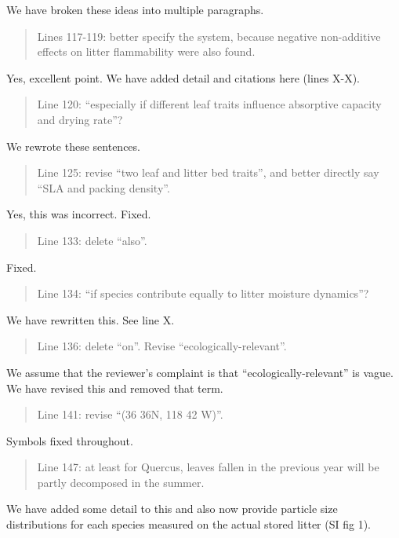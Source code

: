 \documentclass[letterpaper, 12pt]{letter}
\begin{document}
\begin{letter}{}
We have broken these ideas into multiple paragraphs.

\begin{quote}
  Lines 117-119: better specify the system, because negative non-additive
  effects on litter flammability were also found.
\end{quote}

Yes, excellent point. We have added detail and citations here (lines X-X).

\begin{quote}
  Line 120: “especially if different leaf traits influence absorptive capacity
  and drying rate”?
\end{quote}

We rewrote these sentences.

\begin{quote}
  Line 125: revise “two leaf and litter bed traits”, and better directly say
  “SLA and packing density”.
\end{quote}

Yes, this was incorrect. Fixed.

\begin{quote}
  Line 133: delete “also”.
\end{quote}

Fixed.

\begin{quote}
  Line 134: “if species contribute equally to litter moisture dynamics”?
\end{quote}

We have rewritten this. See line X.

\begin{quote}
  Line 136: delete “on”. Revise “ecologically-relevant”.
\end{quote}

We assume that the reviewer's complaint is that ``ecologically-relevant'' is
vague. We have revised this and removed that term.

\begin{quote}
Line 141: revise “(36 36N, 118 42 W)”.
\end{quote}

Symbols fixed throughout.

\begin{quote}
  Line 147: at least for Quercus, leaves fallen in the previous year will be
  partly decomposed in the summer.
\end{quote}

We have added some detail to this and also now provide particle size
distributions for each species measured on the actual stored litter (SI fig 1).


\end{letter}
\end{document}
